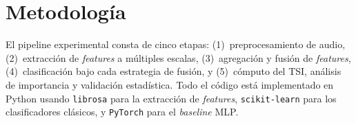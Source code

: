 \documentclass[conference]{IEEEtran}
\begin{document}






\section{Metodología}
El pipeline experimental consta de cinco etapas: (1)~preprocesamiento de audio, (2)~extracción de \textit{features} a múltiples escalas,
(3)~agregación y fusión de \textit{features}, (4)~clasificación bajo cada estrategia de fusión, y
(5)~cómputo del TSI, análisis de importancia y validación estadística.
Todo el código está implementado en Python usando \texttt{librosa} \cite{mcfee2015librosa} para la extracción de \textit{features}, \texttt{scikit-learn} para los clasificadores clásicos, y \texttt{PyTorch} para el \textit{baseline} MLP.
\end{document}
